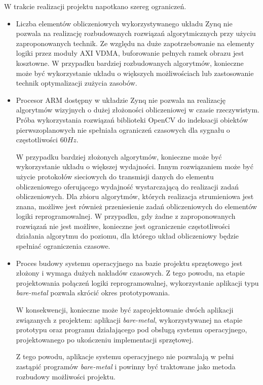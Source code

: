 W trakcie realizacji projektu napotkano szereg ograniczeń. %
\begin{itemize}
	\item Liczba elementów obliczeniowych wykorzystywanego układu Zynq nie pozwala na realizację rozbudowanych rozwiązań algorytmicznych przy użyciu zaproponowanych technik. 
	Ze względu na duże zapotrzebowanie na elementy logiki przez moduły AXI VDMA, buforowanie pełnych ramek obrazu jest kosztowne. 
	W przypadku bardziej rozbudowanych algorytmów, konieczne może być wykorzystanie układu o większych możliwościach lub zastosowanie technik optymalizacji zużycia zasobów.
	
	\item Procesor ARM dostępny w układzie Zynq nie pozwala na realizację algorytmów wizyjnych o dużej złożoności obliczeniowej w  czasie rzeczywistym. 
	Próba wykorzystania rozwiązań biblioteki OpenCV do indeksacji obiektów pierwszoplanowych nie spełniała ograniczeń czasowych dla sygnału o częstotliwości $60Hz$.
	
	W przypadku bardziej złożonych algorytmów, konieczne może być wykorzystanie układu o większej wydajności. 
	Innym rozwiązaniem może być użycie protokołów sieciowych do transmisji danych do elementu obliczeniowego oferującego wydajność wystarczającą do realizacji zadań obliczeniowych. 
	Dla zbioru algorytmów, których realizacja strumieniowa jest znana, możliwe jest również przeniesienie zadań obliczeniowych do elementów logiki reprogramowalnej. 
	W przypadku, gdy żadne z zaproponowanych rozwiązań nie jest możliwe, konieczne jest ograniczenie częstotliwości działania algorytmu do poziomu, dla którego układ obliczeniowy będzie spełniać ograniczenia czasowe.
	
	\item Proces budowy systemu operacyjnego na bazie projektu sprzętowego jest złożony i wymaga dużych nakładów czasowych. 
	Z tego powodu, na etapie projektowania połączeń logiki reprogramowalnej, wykorzystanie aplikacji typu \textit{bare-metal} pozwala skrócić okres prototypowania.
	
	W konsekwencji, konieczne może być zaprojektowanie dwóch aplikacji związanych z projektem: aplikacji \textit{bare-metal}, wykorzystywanej na etapie prototypu oraz programu działającego pod obsługą systemu operacyjnego, projektowanego po ukończeniu implementacji sprzętowej.
	
	Z tego powodu, aplikacje systemu operacyjnego nie pozwalają w pełni zastąpić programów \textit{bare-metal} i powinny być traktowane jako metoda rozbudowy możliwości projektu.
\end{itemize}

